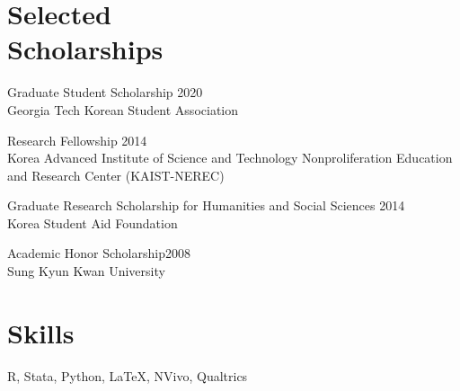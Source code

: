\documentclass[margin,line, 10pt]{res}
\begin{document}
\begin{resume}
\section{\sc Selected\\Scholarships} 
Graduate Student Scholarship  \hfill 2020\\
Georgia Tech Korean Student Association  

\vspace*{-2.5mm}
Research Fellowship \hfill 2014\\
Korea Advanced Institute of Science and Technology Nonproliferation Education and Research Center (KAIST-NEREC)

\vspace*{-2.5mm}
Graduate Research Scholarship for Humanities and Social Sciences \hfill 2014\\
Korea Student Aid Foundation

\vspace*{-2.5mm}
Academic Honor Scholarship\hfill 2008\\
Sung Kyun Kwan University 


\section{\sc Skills} 
R, Stata, Python, \LaTeX, NVivo, Qualtrics




\end{resume}
\thispagestyle{lastpage}
\end{document}
